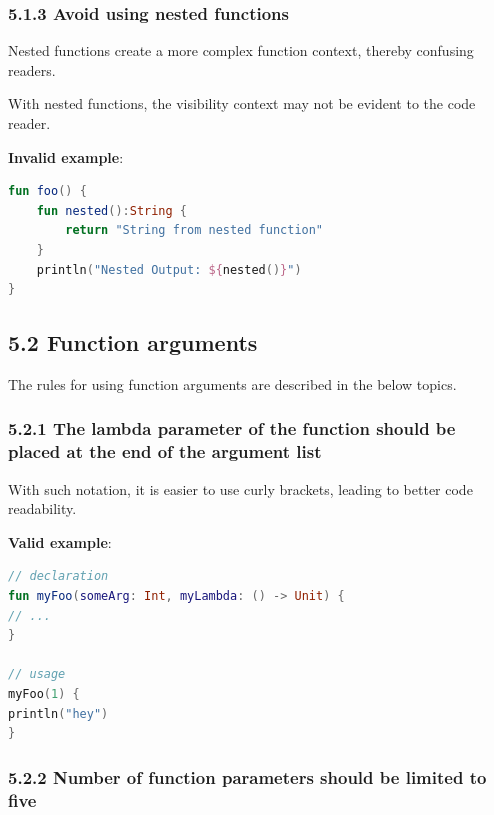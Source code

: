 {{{{\subsubsection*{\textbf{5.1.3 Avoid using nested functions}}
\leavevmode\newline

\label{sec:5.1.3}

Nested functions create a more complex function context, thereby confusing readers.

With nested functions, the visibility context may not be evident to the code reader.



\textbf{Invalid example}:

\begin{lstlisting}[language=Kotlin]
fun foo() { 
    fun nested():String { 
        return "String from nested function" 
    } 
    println("Nested Output: ${nested()}") 
} 
\end{lstlisting}


\subsection*{\textbf{5.2 Function arguments}}

\label{sec:5.2}

The rules for using function arguments are described in the below topics.

\subsubsection*{\textbf{5.2.1 The lambda parameter of the function should be placed at the end of the argument list}}
\leavevmode\newline

\label{sec:5.2.1}



With such notation, it is easier to use curly brackets, leading to better code readability.



\textbf{Valid example}:

\begin{lstlisting}[language=Kotlin]
// declaration
fun myFoo(someArg: Int, myLambda: () -> Unit) {
// ...
}

// usage
myFoo(1) { 
println("hey")
}
\end{lstlisting}


\subsubsection*{\textbf{5.2.2 Number of function parameters should be limited to five}}
\leavevmode\newline

}}}}
